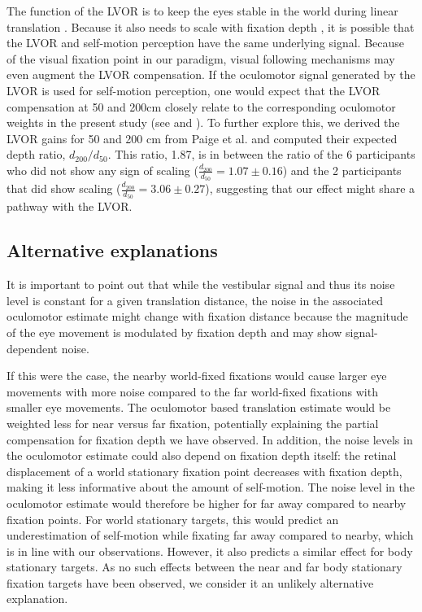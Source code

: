 The function of the LVOR is to keep the eyes stable in the world during linear translation \cite{paige1989,busettini1994,paige1998}. Because it also needs to scale with fixation depth \cite{angelaki2004}, it is possible that the LVOR and self-motion perception have the same underlying signal. Because of the visual fixation point in our paradigm, visual following mechanisms may even augment the LVOR compensation. If the oculomotor signal generated by the LVOR is used for self-motion perception, one would expect that the LVOR compensation at 50 and 200cm closely relate to the corresponding oculomotor weights in the present study (see  and ). To further explore this, we derived the LVOR gains for 50 and 200 \si{\centi\metre} from Paige et al. \citeyear{paige1989} and computed their expected depth ratio, $d_{200} / d_{50}$. This ratio, 1.87, is in between the ratio of the 6 participants who did not show any sign of scaling ($\frac{d_{200}}{d_{50}} = 1.07 \pm 0.16$) and the 2 participants that did show scaling ($\frac{d_{200}}{d_{50}} = 3.06 \pm 0.27$), suggesting that our effect might share a pathway with the LVOR.


\subsection{Alternative explanations}

It is important to point out that while the vestibular signal and thus its noise level is constant for a given translation distance, the noise in the associated oculomotor estimate might change with fixation distance because the magnitude of the eye movement is modulated by fixation depth and may show signal-dependent noise. 

If this were the case, the nearby world-fixed fixations would cause larger eye movements with more noise compared to the far world-fixed fixations with smaller eye movements. The oculomotor based translation estimate would be weighted less for near versus far fixation, potentially explaining the partial compensation for fixation depth we have observed. In addition, the noise levels in the oculomotor estimate could also depend on fixation depth itself: the retinal displacement of a world stationary fixation point decreases with fixation depth, making it less informative about the amount of self-motion. The noise level in the oculomotor estimate would therefore be higher for far away compared to nearby fixation points. For world stationary targets, this would predict an underestimation of self-motion while fixating far away compared to nearby, which is in line with our observations. However, it also predicts a similar effect for body stationary targets. As no such effects between the near and far body stationary fixation targets have been observed, we consider it an unlikely alternative explanation.
 
